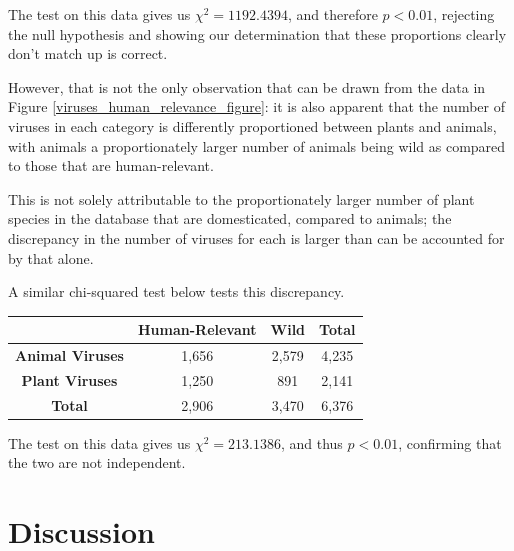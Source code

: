 \documentclass[12pt]{article}
\begin{document}
    The test on this data gives us $\chi^2 = 1192.4394$, and therefore $p < 0.01$,
    rejecting the null hypothesis and showing our determination that these proportions
    clearly don't match up is correct.

    However, that is not the only observation that can be drawn from the data in
    Figure \ref{viruses_human_relevance_figure}: it is also apparent that the number
    of viruses in each category is differently proportioned between plants and
    animals, with animals a proportionately larger number of animals being wild
    as compared to those that are human-relevant.

    This is not solely attributable to the proportionately larger number of
    plant species in the database that are domesticated, compared to animals;
    the discrepancy in the number of viruses for each is larger than can be
    accounted for by that alone.


    A similar chi-squared test below tests this discrepancy.

    \begin{table}[H]
        \begin{tabular}{|c|c|c|c|}
        \hline
                                & \textbf{Human-Relevant} & \textbf{Wild} & \textbf{Total} \\ \hline
        \textbf{Animal Viruses} & 1,656                   & 2,579         & 4,235          \\ \hline
        \textbf{Plant Viruses}  & 1,250                   & 891           & 2,141          \\ \hline
        \textbf{Total}          & 2,906                   & 3,470         & 6,376          \\ \hline
        \end{tabular}
        \end{table}

    The test on this data gives us $\chi^2 = 213.1386$, and thus $p < 0.01$,
    confirming that the two are not independent.

    \section{Discussion} 
\end{document}

